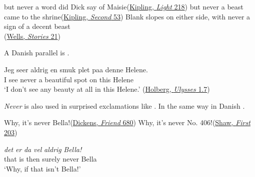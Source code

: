 \ex
but never a word did Dick say of Maisie\hfill(\href{https://archive.org/details/lightthatfailed02kipluoft/page/94/mode/2up?q=%22but+never+a+word+did+Dick+say+of+Maisie%22&view=theater}{Kipling, \textit{Light} 218}) %
\ex
but never a beast came to the shrine\hfill(\href{https://archive.org/details/secondjungleboo03kiplgoog/page/n65/mode/2up?q=%22beast+came+to+the+shrine%22&view=theater}{Kipling, \textit{Second} 53})
\ex
Blank slopes on either side, with never a sign of a decent beast\\ \hfill(\href{https://archive.org/details/twelvestoriesan00wellgoog/page/n74/mode/2up?q=%22with+never+a+sign+of+a+decent+beast%22&view=theater}{Wells, \textit{Stories} 21})
\z
\z


A Danish parallel is .

\ea \label{ex:02-42}
\gll Jeg seer aldrig en smuk plet paa denne Helene.\\
 I see never a beautiful spot on this Helene\\
\glt `I don't see any beauty at all in this Helene.'
\hfill(\href{https://tekster.kb.dk/text/adl-texts-holb04val-shoot-workid100866}{Holberg, \textit{Ulysses} 1.7}) %

\z

\textit{Never} is also used in surprised exclamations like . In the same way in Danish .

\ea \label{ex:02-44}
Why, it's never Bella!\hfill(\href{https://archive.org/details/ourmutualfriendc0000char/page/506/mode/2up?q=%22never+bella%22&view=theater}{Dickens, \textit{Friend} 680})
\ex Why, it's never No. 406!\hfill(\href{https://archive.org/details/fannysfirstplaye00shawrich/page/n55/mode/2up?q=%22Why%2C+it%27s+never+No.+406%21%22&view=theater}{Shaw, \textit{First} 203})
\z

\ea \label{ex:02-45}
\gll \textit{det} \textit{er} \textit{da} \textit{vel} \textit{aldrig} \textit{Bella!}\\
 that is then surely never Bella\\
\glt `Why, if that isn't Bella!'


